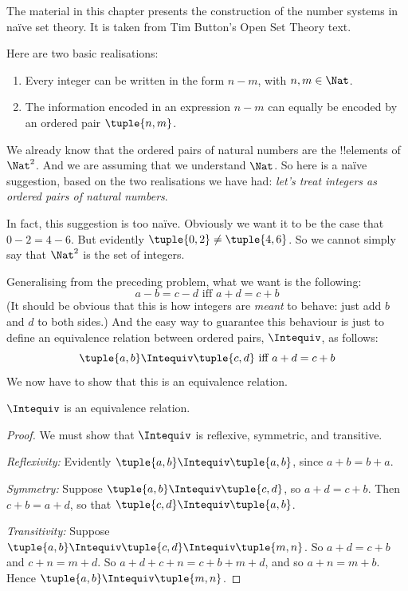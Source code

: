 
\begin{editorial}
The material in this chapter presents the construction of the number
systems in na\"ive set theory. It is taken from Tim Button's Open Set
Theory text.
\end{editorial}




Here are two basic realisations:
	\begin{enumerate}
		\item Every integer can be written in the form $n - m$, with $n, m \in\Nat$.
		\item The information encoded in an expression $n - m$ can equally be encoded by an ordered pair $\tuple{n, m}$.
	\end{enumerate}
We already know that the ordered pairs of natural numbers are the !!{element}s of $\Nat^2$. And we are assuming that we understand $\Nat$. So here is a na\"{i}ve suggestion, based on the two realisations we have had: \emph{let's treat integers as ordered pairs of natural numbers}.

In fact, this suggestion is too na\"{i}ve. Obviously we want it to be the case that $0- 2 = 4 - 6$. But evidently $\tuple{0, 2 }\neq \tuple{4, 6}$. So we cannot simply say that $\Nat^2$ is the set of integers. 

Generalising from the preceding problem, what we want is the following:
	$$a - b = c - d \text{ iff }a + d = c + b$$
(It should be obvious that this is how integers are \emph{meant} to behave: just add $b$ and $d$ to both sides.) And the easy way to guarantee this behaviour is just to define an equivalence relation between ordered pairs, $\Intequiv$, as follows:
$$\tuple{ a, b } \Intequiv \tuple{c, d}\text{ iff }a + d = c + b$$  
We now have to show that this is an equivalence relation.
\begin{prop} $\Intequiv$ is an equivalence relation.
\end{prop}
	\begin{proof}
	We must show that $\Intequiv$ is reflexive, symmetric, and transitive. 
	
	\emph{Reflexivity:} Evidently $\tuple{a, b} \Intequiv \tuple{a, b}$, since $a + b = b + a$.
	
	\emph{Symmetry:} Suppose $\tuple{a, b} \Intequiv \tuple{c, d}$, so $a + d = c + b$. Then $c + b = a + d$, so that $\tuple{c, d} \Intequiv \tuple{a, b}$.
	
	\emph{Transitivity:} Suppose $\tuple{a, b} \Intequiv \tuple{c, d}\Intequiv \tuple{m, n}$. So $a + d = c + b$ and $c + n = m + d$. So $a + d + c + n = c + b + m + d$, and so $a + n = m + b$. Hence $\tuple{a, b } \Intequiv \tuple{m, n}$.		
\end{proof}

